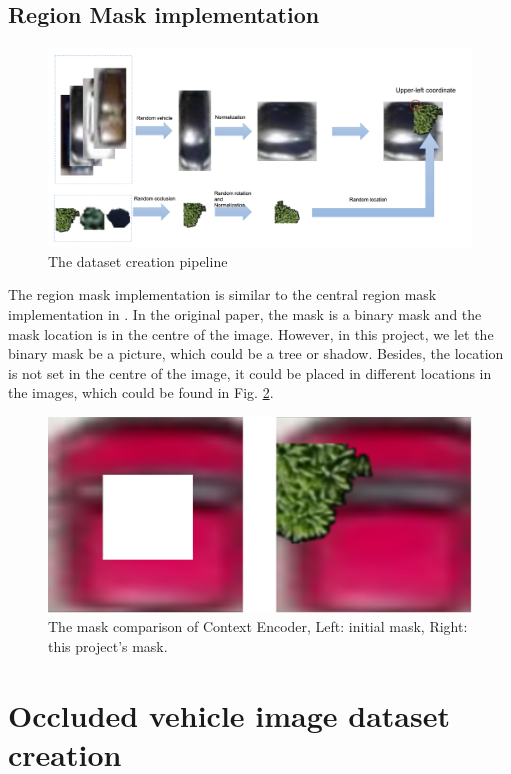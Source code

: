 \subsection{Region Mask implementation}
\begin{figure}[!hbt]
    	\centering
    	\includegraphics[width=0.9\linewidth]{contents/Dataset creation pipeline.png}
    	\caption{The dataset creation pipeline }
        \label{fig:dataset}
    \end{figure}
The region mask implementation is similar to the central region mask implementation in \cite{ce}. In the original paper, the mask is a binary mask and the mask location is in the centre of the image. However, in this project, we let the binary mask be a picture, which could be a tree or shadow. Besides, the location is not set in the centre of the image, it could be placed in different locations in the images, which could be found in Fig. \ref{fig:mask}.

\begin{figure}[!ht]
	\centering
	\includegraphics[width=0.9\linewidth]{contents/region comparison.png}
	\caption{The mask comparison of Context Encoder, Left: initial mask, Right: this project's mask.}
    \label{fig:mask}
\end{figure}


\section{Occluded vehicle image dataset creation}

